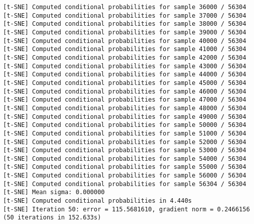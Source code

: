 \documentclass[11pt]{article}
\begin{document}
\begin{Verbatim}[commandchars=\\\{\}]
[t-SNE] Computed conditional probabilities for sample 36000 / 56304
[t-SNE] Computed conditional probabilities for sample 37000 / 56304
[t-SNE] Computed conditional probabilities for sample 38000 / 56304
[t-SNE] Computed conditional probabilities for sample 39000 / 56304
[t-SNE] Computed conditional probabilities for sample 40000 / 56304
[t-SNE] Computed conditional probabilities for sample 41000 / 56304
[t-SNE] Computed conditional probabilities for sample 42000 / 56304
[t-SNE] Computed conditional probabilities for sample 43000 / 56304
[t-SNE] Computed conditional probabilities for sample 44000 / 56304
[t-SNE] Computed conditional probabilities for sample 45000 / 56304
[t-SNE] Computed conditional probabilities for sample 46000 / 56304
[t-SNE] Computed conditional probabilities for sample 47000 / 56304
[t-SNE] Computed conditional probabilities for sample 48000 / 56304
[t-SNE] Computed conditional probabilities for sample 49000 / 56304
[t-SNE] Computed conditional probabilities for sample 50000 / 56304
[t-SNE] Computed conditional probabilities for sample 51000 / 56304
[t-SNE] Computed conditional probabilities for sample 52000 / 56304
[t-SNE] Computed conditional probabilities for sample 53000 / 56304
[t-SNE] Computed conditional probabilities for sample 54000 / 56304
[t-SNE] Computed conditional probabilities for sample 55000 / 56304
[t-SNE] Computed conditional probabilities for sample 56000 / 56304
[t-SNE] Computed conditional probabilities for sample 56304 / 56304
[t-SNE] Mean sigma: 0.000000
[t-SNE] Computed conditional probabilities in 4.440s
[t-SNE] Iteration 50: error = 115.5681610, gradient norm = 0.2466156 (50 iterations in 152.633s)

    \end{Verbatim}
\end{document}
